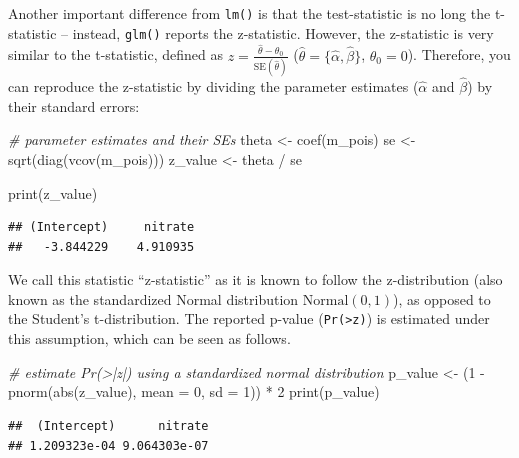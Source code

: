 \documentclass[
]{book}
\newenvironment{Shaded}{\begin{snugshade}}{\end{snugshade}}
\newcommand{\AttributeTok}[1]{\textcolor[rgb]{0.77,0.63,0.00}{#1}}
\newcommand{\CommentTok}[1]{\textcolor[rgb]{0.56,0.35,0.01}{\textit{#1}}}
\newcommand{\DecValTok}[1]{\textcolor[rgb]{0.00,0.00,0.81}{#1}}
\newcommand{\FunctionTok}[1]{\textcolor[rgb]{0.00,0.00,0.00}{#1}}
\newcommand{\NormalTok}[1]{#1}
\newcommand{\OtherTok}[1]{\textcolor[rgb]{0.56,0.35,0.01}{#1}}
\newcommand{\SpecialCharTok}[1]{\textcolor[rgb]{0.00,0.00,0.00}{#1}}
\begin{document}
Another important difference from \texttt{lm()} is that the test-statistic is no long the t-statistic -- instead, \texttt{glm()} reports the z-statistic. However, the z-statistic is very similar to the t-statistic, defined as \(z=\frac{\hat{\theta} - \theta_0}{\text{SE}(\hat{\theta})}\) (\(\hat{\theta} = \{\hat{\alpha}, \hat{\beta}\}\), \(\theta_0 = 0\)). Therefore, you can reproduce the z-statistic by dividing the parameter estimates (\(\hat{\alpha}\) and \(\hat{\beta}\)) by their standard errors:

\begin{Shaded}
\begin{Highlighting}[]
\CommentTok{\# parameter estimates and their SEs}
\NormalTok{theta }\OtherTok{\textless{}{-}} \FunctionTok{coef}\NormalTok{(m\_pois)}
\NormalTok{se }\OtherTok{\textless{}{-}} \FunctionTok{sqrt}\NormalTok{(}\FunctionTok{diag}\NormalTok{(}\FunctionTok{vcov}\NormalTok{(m\_pois)))}
\NormalTok{z\_value }\OtherTok{\textless{}{-}}\NormalTok{ theta }\SpecialCharTok{/}\NormalTok{ se}

\FunctionTok{print}\NormalTok{(z\_value)}
\end{Highlighting}
\end{Shaded}

\begin{verbatim}
## (Intercept)     nitrate 
##   -3.844229    4.910935
\end{verbatim}

We call this statistic ``z-statistic'' as it is known to follow the z-distribution (also known as the standardized Normal distribution \(\text{Normal}(0, 1)\)), as opposed to the Student's t-distribution. The reported p-value (\texttt{Pr(\textgreater{}\textbar{}z\textbar{})}) is estimated under this assumption, which can be seen as follows.

\begin{Shaded}
\begin{Highlighting}[]
\CommentTok{\# estimate Pr(\textgreater{}|z|) using a standardized normal distribution}
\NormalTok{p\_value }\OtherTok{\textless{}{-}}\NormalTok{ (}\DecValTok{1} \SpecialCharTok{{-}} \FunctionTok{pnorm}\NormalTok{(}\FunctionTok{abs}\NormalTok{(z\_value), }\AttributeTok{mean =} \DecValTok{0}\NormalTok{, }\AttributeTok{sd =} \DecValTok{1}\NormalTok{)) }\SpecialCharTok{*} \DecValTok{2}
\FunctionTok{print}\NormalTok{(p\_value)}
\end{Highlighting}
\end{Shaded}

\begin{verbatim}
##  (Intercept)      nitrate 
## 1.209323e-04 9.064303e-07
\end{verbatim}
\end{document}
